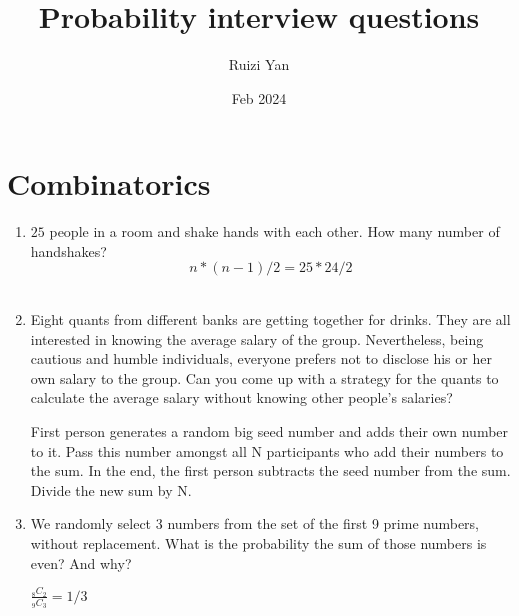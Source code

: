 \documentclass{article}
\title{Probability interview questions}
\author{Ruizi Yan}
\date{Feb 2024}
\begin{document}
\maketitle

\tableofcontents

\section{Combinatorics}
\begin{enumerate}
    \item  $25$ people in a room and shake hands with each other. How many number of handshakes? 
    $$n*(n-1)/2 = 25*24/2$$ \\
    \item Eight quants from different banks are getting together for drinks. They are all interested in knowing the average salary of the group. Nevertheless, being cautious and humble individuals, everyone prefers not to disclose his or her own salary to the group. Can you come up with a strategy for the quants to calculate the average salary without knowing other people's salaries?

    First person generates a random big seed number and adds their own number to it. Pass this number amongst all N participants who add their numbers to the sum. In the end, the first person subtracts the seed number from the sum. Divide the new sum by N.

    \item We randomly select 3 numbers from the set of the first 9 prime numbers, without replacement. What is the probability the sum of those numbers is even? And why?

    $\frac{_8C_2}{_9C_3} = 1/3$
\end{enumerate}
\end{document}

